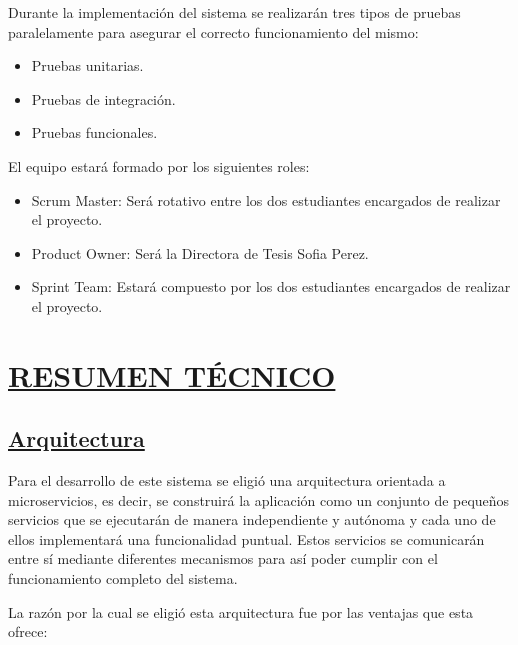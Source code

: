 Durante la implementación del sistema se realizarán tres tipos de pruebas paralelamente para asegurar el correcto funcionamiento del mismo:

\begin{itemize}
	\item Pruebas unitarias.
	\item Pruebas de integración.
	\item Pruebas funcionales.\\
\end{itemize}

El equipo estará formado por los siguientes roles:
\begin{itemize}
	\item Scrum Master: Será rotativo entre los dos estudiantes encargados de realizar el proyecto.
	\item Product Owner: Será la Directora de Tesis Sofia Perez.
	\item Sprint Team: Estará compuesto por los dos estudiantes encargados de realizar el proyecto.\\
\end{itemize}

\section*{\underline{RESUMEN TÉCNICO}}

\subsection*{\underline{Arquitectura}}

Para el desarrollo de este sistema se eligió una arquitectura orientada a microservicios, es decir, se construirá la aplicación como un conjunto de pequeños servicios que se ejecutarán de manera independiente y autónoma y cada uno de ellos implementará una funcionalidad puntual. Estos servicios se comunicarán entre sí mediante diferentes mecanismos para así poder cumplir con el funcionamiento completo del sistema.

La razón por la cual se eligió esta arquitectura fue por las ventajas que esta ofrece:

